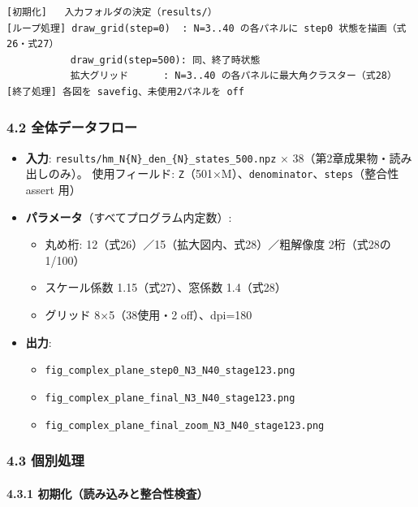 \documentclass[
  a4paper,
]{ltjsarticle}
\providecommand{\tightlist}{%
  \setlength{\itemsep}{0pt}\setlength{\parskip}{0pt}}
\begin{document}
\begin{verbatim}
[初期化]   入力フォルダの決定（results/）
[ループ処理] draw_grid(step=0)  : N=3..40 の各パネルに step0 状態を描画（式26・式27）
           draw_grid(step=500): 同、終了時状態
           拡大グリッド      : N=3..40 の各パネルに最大角クラスター（式28）
[終了処理] 各図を savefig、未使用2パネルを off
\end{verbatim}

\subsubsection{4.2
全体データフロー}\label{ux5168ux4f53ux30c7ux30fcux30bfux30d5ux30edux30fc}

\begin{itemize}
\tightlist
\item
  \textbf{入力}:
  \texttt{results/hm\_N\{N\}\_den\_\{N\}\_states\_500.npz} ×
  38（第2章成果物・読み出しのみ）。 使用フィールド:
  \texttt{Z}（501×M）、\texttt{denominator}、\texttt{steps}（整合性
  assert 用）
\item
  \textbf{パラメータ}（すべてプログラム内定数）:

  \begin{itemize}
  \tightlist
  \item
    丸め桁: 12（式26）／15（拡大図内、式28）／粗解像度 2桁（式28の
    1/100）
  \item
    スケール係数 1.15（式27）、窓係数 1.4（式28）
  \item
    グリッド 8×5（38使用・2 off）、dpi=180
  \end{itemize}
\item
  \textbf{出力}:

  \begin{itemize}
  \tightlist
  \item
    \texttt{fig\_complex\_plane\_step0\_N3\_N40\_stage123.png}
  \item
    \texttt{fig\_complex\_plane\_final\_N3\_N40\_stage123.png}
  \item
    \texttt{fig\_complex\_plane\_final\_zoom\_N3\_N40\_stage123.png}
  \end{itemize}
\end{itemize}

\subsubsection{4.3 個別処理}\label{ux500bux5225ux51e6ux7406}

\paragraph{4.3.1
初期化（読み込みと整合性検査）}\label{ux521dux671fux5316ux8aadux307fux8fbcux307fux3068ux6574ux5408ux6027ux691cux67fb}
\end{document}
